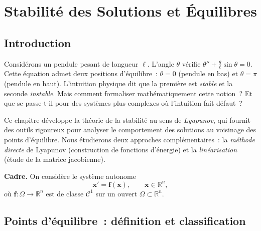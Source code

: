 \documentclass[12pt,a4paper,openany]{book}
\theoremstyle{definition}
\theoremstyle{plain}
\theoremstyle{remark}
\newcommand{\R}{\mathbb{R}}
\begin{document}

\chapter{Stabilité des Solutions et Équilibres}\label{ch:stabilite}

\section*{Introduction}

Considérons un pendule pesant de longueur $\ell$. L'angle $\theta$
vérifie $\theta''+\frac{g}{\ell}\sin\theta=0$. Cette équation admet
deux positions d'équilibre~: $\theta=0$ (pendule en bas) et
$\theta=\pi$ (pendule en haut). L'intuition physique dit que la
première est \emph{stable} et la seconde \emph{instable}. Mais
comment formaliser mathématiquement cette notion~? Et que se passe-t-il
pour des systèmes plus complexes où l'intuition fait défaut~?


Ce chapitre développe la théorie de la stabilité au sens de
\emph{Lyapunov}, qui fournit des outils
rigoureux pour analyser le comportement des solutions au voisinage
des points d'équilibre. Nous étudierons deux approches
complémentaires~: la \emph{méthode directe} de Lyapunov (construction
de fonctions d'énergie) et la \emph{linéarisation} (étude de la
matrice jacobienne).

\medskip

\noindent\textbf{Cadre.} On considère le système autonome
\begin{equation}\label{eq:syst-autonome}
  \mathbf{x}'=\mathbf{f}(\mathbf{x}),
  \qquad \mathbf{x}\in\R^n,
\end{equation}
où $\mathbf{f}:\Omega\to\R^n$ est de classe $\mathcal{C}^1$ sur un
ouvert $\Omega\subset\R^n$.

\section{Points d'équilibre~: définition et classification}\label{sec:pts-equilibre}
\end{document}
